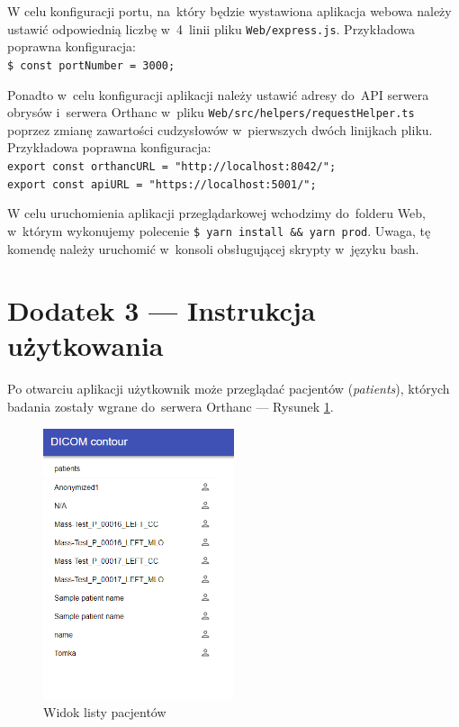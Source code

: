 \documentclass[a4paper,11pt,twoside,openright]{report}
\theoremstyle{definition}
\begin{document}
W celu konfiguracji portu, na~który będzie wystawiona aplikacja webowa należy
ustawić odpowiednią liczbę w~4~linii pliku \texttt{Web/express.js}. Przykładowa poprawna
konfiguracja:\\
\texttt{\$ const portNumber = 3000;}

Ponadto w~celu konfiguracji aplikacji należy ustawić adresy do~API serwera obrysów
i~serwera Orthanc w~pliku \texttt{Web/src/helpers/requestHelper.ts} poprzez zmianę zawartości
cudzysłowów w~pierwszych dwóch linijkach pliku. 	Przykładowa poprawna konfiguracja:\\
\texttt{export const orthancURL = "http://localhost:8042/";}\\
\texttt{export const apiURL = "https://localhost:5001/";}

W celu uruchomienia aplikacji przeglądarkowej wchodzimy do~folderu Web, w~którym
wykonujemy polecenie \texttt{\$ yarn install \&\& yarn prod}. Uwaga, tę komendę
należy uruchomić w~konsoli obsługującej skrypty w~języku bash.




\newpage
\chapter*{Dodatek 3 --- Instrukcja użytkowania}

Po otwarciu aplikacji użytkownik może przeglądać pacjentów (\textit{patients}), których
badania zostały wgrane do~serwera Orthanc --- Rysunek \ref{fig:1}.

\begin{figure}[h!]
	\center
	\includegraphics[width=0.5\textwidth]{1}
	\caption{Widok listy pacjentów}
    	\label{fig:1}
\end{figure}
\end{document}
